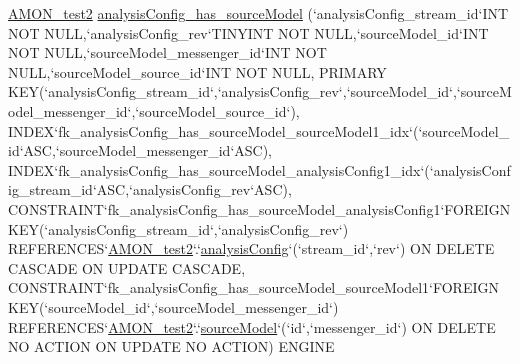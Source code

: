 \begin{DoxyCompactItemize}
\hyperlink{db__mc__build_8sql_a19c21c59303d8b6591b92240ff7de1d5}{A\-M\-O\-N\-\_\-test2} \hyperlink{db__mc__build_8sql_ac9327f79785d9bd44ca483f4fc54b878}{analysis\-Config\-\_\-has\-\_\-source\-Model} (`analysis\-Config\-\_\-stream\-\_\-id`I\-N\-T N\-O\-T N\-U\-L\-L,`analysis\-Config\-\_\-rev`T\-I\-N\-Y\-I\-N\-T N\-O\-T N\-U\-L\-L,`source\-Model\-\_\-id`I\-N\-T N\-O\-T N\-U\-L\-L,`source\-Model\-\_\-messenger\-\_\-id`I\-N\-T N\-O\-T N\-U\-L\-L,`source\-Model\-\_\-source\-\_\-id`I\-N\-T N\-O\-T N\-U\-L\-L, P\-R\-I\-M\-A\-R\-Y K\-E\-Y(`analysis\-Config\-\_\-stream\-\_\-id`,`analysis\-Config\-\_\-rev`,`source\-Model\-\_\-id`,`source\-Model\-\_\-messenger\-\_\-id`,`source\-Model\-\_\-source\-\_\-id`), I\-N\-D\-E\-X`fk\-\_\-analysis\-Config\-\_\-has\-\_\-source\-Model\-\_\-source\-Model1\-\_\-idx`(`source\-Model\-\_\-id`A\-S\-C,`source\-Model\-\_\-messenger\-\_\-id`A\-S\-C), I\-N\-D\-E\-X`fk\-\_\-analysis\-Config\-\_\-has\-\_\-source\-Model\-\_\-analysis\-Config1\-\_\-idx`(`analysis\-Config\-\_\-stream\-\_\-id`A\-S\-C,`analysis\-Config\-\_\-rev`A\-S\-C), C\-O\-N\-S\-T\-R\-A\-I\-N\-T`fk\-\_\-analysis\-Config\-\_\-has\-\_\-source\-Model\-\_\-analysis\-Config1`F\-O\-R\-E\-I\-G\-N K\-E\-Y(`analysis\-Config\-\_\-stream\-\_\-id`,`analysis\-Config\-\_\-rev`) R\-E\-F\-E\-R\-E\-N\-C\-E\-S`\hyperlink{db__mc__build_8sql_a19c21c59303d8b6591b92240ff7de1d5}{A\-M\-O\-N\-\_\-test2}`.`\hyperlink{db__mc__build_8sql_a4a9f4a95bbb46957f7f01b91207e74ae}{analysis\-Config}`(`stream\-\_\-id`,`rev`) O\-N D\-E\-L\-E\-T\-E C\-A\-S\-C\-A\-D\-E O\-N U\-P\-D\-A\-T\-E C\-A\-S\-C\-A\-D\-E, C\-O\-N\-S\-T\-R\-A\-I\-N\-T`fk\-\_\-analysis\-Config\-\_\-has\-\_\-source\-Model\-\_\-source\-Model1`F\-O\-R\-E\-I\-G\-N K\-E\-Y(`source\-Model\-\_\-id`,`source\-Model\-\_\-messenger\-\_\-id`) R\-E\-F\-E\-R\-E\-N\-C\-E\-S`\hyperlink{db__mc__build_8sql_a19c21c59303d8b6591b92240ff7de1d5}{A\-M\-O\-N\-\_\-test2}`.`\hyperlink{db__mc__build_8sql_a623797c037cb18b880ed6982ebd22fc4}{source\-Model}`(`id`,`messenger\-\_\-id`) O\-N D\-E\-L\-E\-T\-E N\-O A\-C\-T\-I\-O\-N O\-N U\-P\-D\-A\-T\-E N\-O A\-C\-T\-I\-O\-N) E\-N\-G\-I\-N\-E
\end{DoxyCompactItemize}
